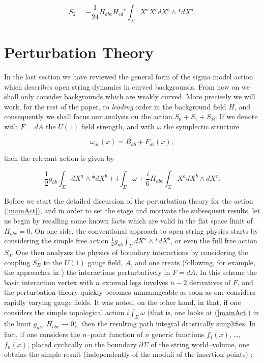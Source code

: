 \documentclass[a4paper,11pt]{article}
\begin{document}
$$
S_{2}=-\frac{1}{24}H_{abe}{H_{cd}}^{e}\int_{\Sigma }X^{a}X^{c}dX^{b} 
\wedge \ast dX^{d}.
$$


\section{Perturbation Theory}


In the last section we have reviewed the general form of the sigma model
action which describes open string dynamics in curved backgrounds. From now
on we shall only consider backgrounds which are weakly curved. More
precisely we will work, for the rest of the paper, to \textit{leading} order
in the background field $H$, and consequently we shall focus our 
analysis on the action $S_{0} + S_{1} + S_{B}$. If we denote with $F=dA$ the 
$U\left( 1\right) $ field strength, and with $\omega$ the symplectic 
structure

\begin{equation}
\omega_{ab}\left( x\right) = B_{ab}+F_{ab}\left( x\right) ,
\label{omega}
\end{equation}

\noindent
then the relevant action is given by 

\begin{equation}
\frac{1}{2}g_{ab} \int_{\Sigma } dX^{a} \wedge \ast dX^{b} + i \int_{\Sigma}
\omega + \frac{i}{6} H_{abc} \int_{\Sigma} X^{a} dX^{b} \wedge dX^{c}.
\label{mainAct}
\end{equation}

Before we start the detailed discussion of the perturbation theory for the
action (\ref{mainAct}), and in order to set the stage and motivate the
subsequent results, let us begin by recalling some known facts which are 
valid in the flat space limit of $H_{abc}=0$. On one side, the conventional 
approach to open string physics starts by considering the simple free action 
$\frac{1}{2} g_{ab} \int_{\Sigma} dX^{a} \wedge \ast dX^{b}$, or even the full 
free action $S_{0}$. One then analyzes the physics of boundary interactions by
considering the coupling $S_{B}$ to the $U(1)$ gauge field, $A$, and one
treats (following, for example, the approaches in \cite{Fradkin-Tseytlin, 
ACNY, CLNY}) the interactions perturbatively in $F=dA$. In this scheme the 
basic interaction vertex with $n$ external legs involves $n-2$ derivatives of 
$F$, and the perturbation theory quickly becomes unmanageable as soon as one 
considers rapidly varying gauge fields. It was noted, on the other hand, in 
\cite{Cattaneo-Felder} that, if one considers the simple topological action $i 
\int_{\Sigma} \omega$ (that is, one looks at (\ref{mainAct}) in the limit 
$g_{ab}$, $H_{abc} \to 0$), then the resulting path integral drastically 
simplifies. In fact, if one considers the $n$--point function of $n$ generic 
functions $f_{1}\left( x\right)$, \ldots, $f_{n}\left( x\right)$, placed 
cyclically on the boundary $\partial \Sigma$ of the string world--volume, one 
obtains the simple result (independently of the moduli of the insertion 
points) \cite{Cattaneo-Felder,Seiberg-Witten}: 
\end{document}
